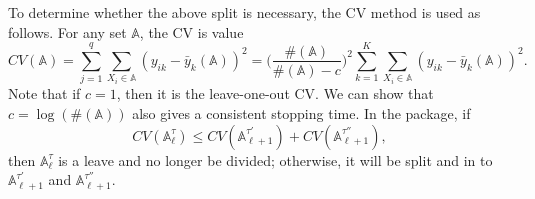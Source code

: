 \documentclass[nojss]{jss}
\numberwithin{equation}{section}
\begin{document}
To determine whether the above split is necessary, the CV method is used as follows. For any set $ \mathbb{A} $, the CV is value
$$
  CV(\mathbb{A}) = \sum_{j=1}^q\sum_{X_i \in  \mathbb{A}} ( y_{ik} - \bar y_k(\mathbb{A}))^2 = \Big(\frac{\#(\mathbb{A})}{\#(\mathbb{A}) -c}\Big)^2 \sum_{k=1}^K\sum_{X_i \in  \mathbb{A}} ( y_{ik} - \bar y_k(\mathbb{A}))^2.
$$
Note that if $ c = 1 $, then it is the leave-one-out CV. We can show that $ c = \log(\#(\mathbb{A})) $ also gives a consistent stopping time.  In the package,  if
$$ CV(\mathbb{A}_\ell^\tau ) \le CV(\mathbb{A}_{\ell+1}^{\tau'}) + CV(\mathbb{A}_{\ell+1}^{\tau''}), $$
then $ \mathbb{A}_\ell^\tau $ is a leave and no longer be divided; otherwise, it will be split and in to $ \mathbb{A}_{\ell+1}^{\tau'} $ and $ \mathbb{A}_{\ell+1}^{\tau''} $.


\end{document}
